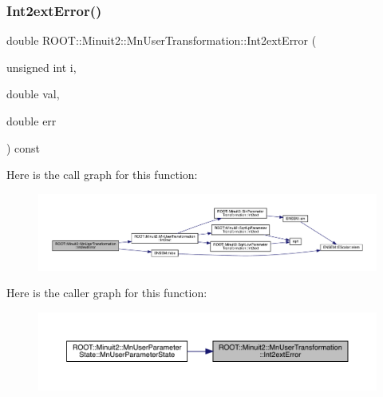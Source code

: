 \mbox{\label{classROOT_1_1Minuit2_1_1MnUserTransformation_ad900f367f4d2c5df13f899dd55bdf212}} 
\subsubsection{\texorpdfstring{Int2extError()}{Int2extError()}\hspace{0.1cm}{\footnotesize\ttfamily [1/2]}}
{\footnotesize\ttfamily double R\+O\+O\+T\+::\+Minuit2\+::\+Mn\+User\+Transformation\+::\+Int2ext\+Error (\begin{DoxyParamCaption}\item[{unsigned int}]{i,  }\item[{double}]{val,  }\item[{double}]{err }\end{DoxyParamCaption}) const}

Here is the call graph for this function\+:\nopagebreak
\begin{figure}[H]
\begin{center}
\leavevmode
\includegraphics[width=350pt]{d9/d98/classROOT_1_1Minuit2_1_1MnUserTransformation_ad900f367f4d2c5df13f899dd55bdf212_cgraph}
\end{center}
\end{figure}
Here is the caller graph for this function\+:\nopagebreak
\begin{figure}[H]
\begin{center}
\leavevmode
\includegraphics[width=350pt]{d9/d98/classROOT_1_1Minuit2_1_1MnUserTransformation_ad900f367f4d2c5df13f899dd55bdf212_icgraph}
\end{center}
\end{figure}
\mbox{\label{classROOT_1_1Minuit2_1_1MnUserTransformation_ad900f367f4d2c5df13f899dd55bdf212}} 
